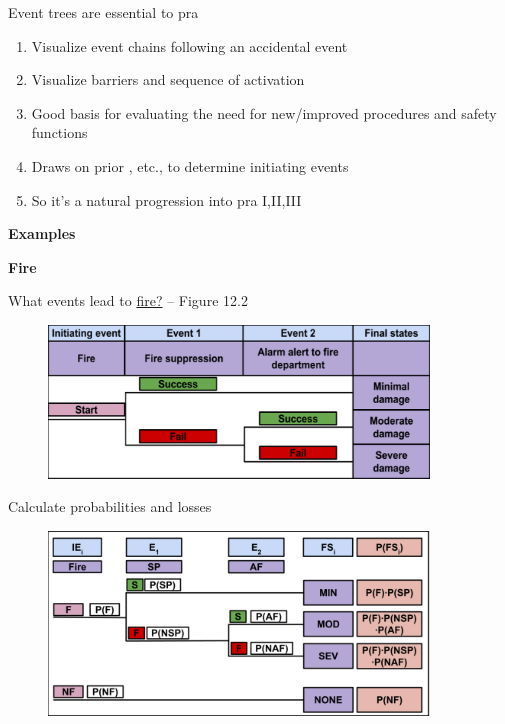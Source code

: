 \documentclass[aspectratio=1610,pdftex,dvipsnames,compress,xcolor={dvipsnames}]{beamer}
\newcommand{\acs}{\acrshort} %
\newcommand{\acsp}{\acrshortpl} %
\begin{document}
\begin{frame}{Event trees are essential to \acs{pra}}
    \begin{enumerate}[series=outerlist,topsep=0pt,itemsep=21pt,leftmargin=*,label=(\arabic*)]
        \item[]Visualize event chains following an accidental event
        \item[]Visualize barriers and sequence of activation
        \item[]Good basis for evaluating the need for new/improved procedures and safety functions
        \item[]Draws on prior \acsp{pra}, etc., to determine initiating events
        \item[]So it's a natural progression into \acs{pra} I,II,III
    \end{enumerate}
\end{frame}


\begin{frame}[plain]{}
    \centering\LARGE\textbf{Examples}
\end{frame}


\begin{frame}[plain]{}
    \centering\LARGE\textbf{Fire}
\end{frame}


\addtocounter{framenumber}{-2}
\begin{frame}{What events lead to \href{https://uidaho.pressbooks.pub/riskassessment/chapter/event-trees-2/}{fire?} -- Figure 12.2}
    \begin{figure}
        \centering
        \includegraphics[width=0.90\textwidth]{event.tree_fire.jpg}
    \end{figure}
\end{frame}


\begin{frame}{Calculate probabilities and losses}
    \begin{figure}
        \centering
        \includegraphics[width=0.90\textwidth]{event.tree_fire.loss.jpg}
    \end{figure}
\end{frame}
\end{document}
